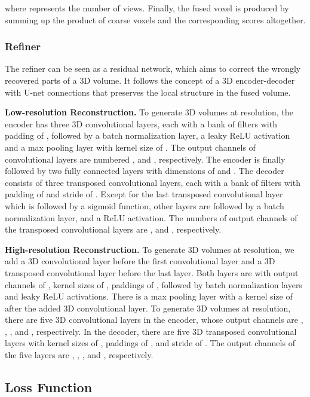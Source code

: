 \documentclass[twocolumn]{svjour3}
\begin{document}
where  represents the number of views.
Finally, the fused voxel  is produced by summing up the product of coarse voxels and the corresponding scores altogether.



\subsubsection{Refiner}

The refiner can be seen as a residual network, which aims to correct the wrongly recovered parts of a 3D volume.
It follows the concept of a 3D encoder-decoder with U-net connections \citep{DBLP:conf/miccai/RonnebergerFB15} that preserves the local structure in the fused volume.

\noindent \textbf{Low-resolution Reconstruction.}
To generate 3D volumes at  resolution, the encoder has three 3D convolutional layers, each with a bank of  filters with padding of , followed by a batch normalization layer, a leaky ReLU activation and a max pooling layer with kernel size of .
The output channels of convolutional layers are numbered ,  and , respectively.
The encoder is finally followed by two fully connected layers with dimensions of  and .
The decoder consists of three transposed convolutional layers, each with a bank of  filters with padding of  and stride of .
Except for the last transposed convolutional layer which is followed by a sigmoid function, other layers are followed by a batch normalization layer, and a ReLU activation.
The numbers of output channels of the transposed convolutional layers are ,  and , respectively.

\noindent \textbf{High-resolution Reconstruction.}
To generate 3D volumes at  resolution, we add a 3D convolutional layer before the first convolutional layer and a 3D transposed convolutional layer before the last layer.
Both layers are with output channels of , kernel sizes of , paddings of , followed by batch normalization layers and leaky ReLU activations.
There is a max pooling layer with a kernel size of  after the added 3D convolutional layer.
To generate 3D volumes at  resolution, there are five 3D convolutional layers in the encoder, whose output channels are , , ,  and , respectively.
In the decoder, there are five 3D transposed convolutional layers with kernel sizes of , paddings of , and stride of .
The output channels of the five layers are , , ,  and , respectively.

\subsection{Loss Function}
\end{document}
